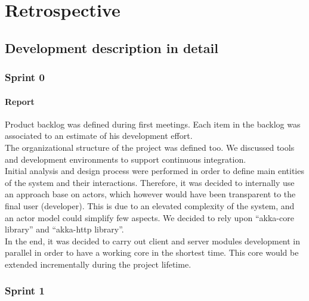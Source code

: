 \chapter{Retrospective}

\section{Development description in detail}

\subsection{Sprint 0}
\subsubsection{Report}
Product backlog was defined during first meetings. Each item in the backlog was associated to an estimate of his development effort.
\\
The organizational structure of the project was defined too. We discussed tools and development environments to support continuous integration.
\\
Initial analysis and design process were performed in order to define main entities of the system and their interactions.
Therefore, it was decided to internally use an approach base on actors, which however would have been transparent to the final user (developer). This is due to an elevated complexity of the system, and an actor model could simplify few aspects. 
We decided to rely upon ``akka-core library'' and ``akka-http library''. 
\\
In the end, it was decided to carry out client and server modules development in parallel in order to have a working core in the shortest time. This core would be extended incrementally during the project lifetime.




\subsection{Sprint 1}
